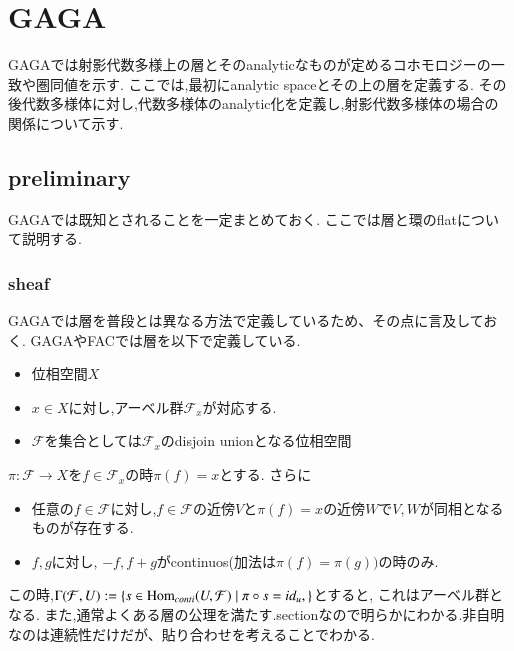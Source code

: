 \chapter{GAGA}
GAGAでは射影代数多様上の層とそのanalyticなものが定めるコホモロジーの一致や圏同値を示す.
ここでは,最初にanalytic spaceとその上の層を定義する.
その後代数多様体に対し,代数多様体のanalytic化を定義し,射影代数多様体の場合の関係について示す.
\section{preliminary}
GAGAでは既知とされることを一定まとめておく.
ここでは層と環のflatについて説明する.
\subsection{sheaf}
GAGAでは層を普段とは異なる方法で定義しているため、その点に言及しておく.
GAGAやFACでは層を以下で定義している.
\begin{screen}
\begin{dfn}
\begin{itemize}
以下の組を層という.
  \item 位相空間$X$
  \item $x \in X$に対し,アーベル群$\mathcal{F}_x$が対応する.
  \item $\mathcal{F}$を集合としては$\mathcal{F}_x$のdisjoin unionとなる位相空間
\end{itemize}
$\pi: \mathcal{F} \to X$を$f \in \mathcal{F}_x$の時$\pi(f)=x$とする.
さらに
\begin{itemize}
  \item 任意の$f \in \mathcal{F}$に対し,$f \in \mathcal{F}$の近傍$V$と$\pi(f)=x$の近傍$W$で$V,W$が同相となるものが存在する.
  \item $f,g$に対し, $-f , f + g$がcontinuos(加法は$\pi(f) = \pi(g))$の時のみ.
\end{itemize}
\end{dfn}
\end{screen}

この時,$\Gamma(\mathcal{F}, U) := \{ s \in  \text{\rm Hom}_{conti}(U,\mathcal{F}) \mid \pi \circ s = id_u, \}$とすると,
これはアーベル群となる.
また,通常よくある層の公理を満たす.sectionなので明らかにわかる.非自明なのは連続性だけだが、貼り合わせを考えることでわかる.

